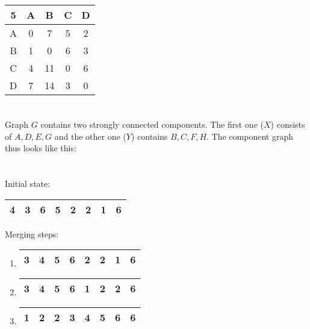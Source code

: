 \documentclass[12pt, a4paper]{article}
\begin{document}
\begin{tabular}{|c|c|c|c|c|}
	\hline
	5 & A & B & C & D\\
	\hline
	A & 0 & 7 & 5 & 2\\
	\hline
	B & 1 & 0 & 6 & 3\\
	\hline
	C & 4 & 11 & 0 & 6\\
	\hline
	D & 7 & 14 & 3 & 0\\
	\hline
\end{tabular}

\section{} %

Graph $G$ contains two strongly connected components. The first one ($X$) consists of $A, D, E, G$ and the other one ($Y$) contains $B, C, F, H$. The component graph thus looks like this:


\section{} %

Initial state:

\begin{tabular}{|c|c|c|c|c|c|c|c|}
	\hline
	4 & 3 & 6 & 5 & 2 & 2 & 1 & 6\\
	\hline
\end{tabular}

Merging steps:

\begin{enumerate}
	\item \begin{tabular}{|c|c|c|c|c|c|c|c|}
		\hline
		3 & 4 & 5 & 6 & 2 & 2 & 1 & 6\\
		\hline
	\end{tabular}
	\item \begin{tabular}{|c|c|c|c|c|c|c|c|}
		\hline
		3 & 4 & 5 & 6 & 1 & 2 & 2 & 6\\
		\hline
	\end{tabular}
	\item \begin{tabular}{|c|c|c|c|c|c|c|c|}
		\hline
		1 & 2 & 2 & 3 & 4 & 5 & 6 & 6\\
		\hline
	\end{tabular}
\end{enumerate}
\end{document}
